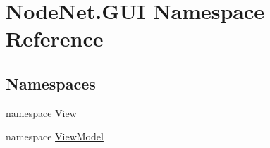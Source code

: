 \hypertarget{namespace_node_net_1_1_g_u_i}{}\section{Node\+Net.\+G\+UI Namespace Reference}
\label{namespace_node_net_1_1_g_u_i}
\subsection*{Namespaces}
\begin{DoxyCompactItemize}
\item 
namespace \hyperlink{namespace_node_net_1_1_g_u_i_1_1_view}{View}
\item 
namespace \hyperlink{namespace_node_net_1_1_g_u_i_1_1_view_model}{View\+Model}
\end{DoxyCompactItemize}
